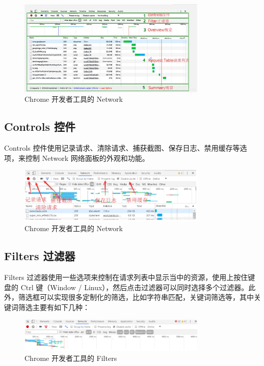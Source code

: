 \begin{figure}[htb]
\centering 
\includegraphics[width=0.80\textwidth]{img/newch1m7.png} 
\caption{Chrome 开发者工具的 Network}
\label{Test}
\end{figure}

\subsection{Controls 控件}

Controls 控件使用记录请求、清除请求、捕获截图、保存日志、禁用缓存等选项，来控制 Network 网络面板的外观和功能。

\begin{figure}[htb]
\centering 
\includegraphics[width=0.80\textwidth]{img/newch1m8.png} 
\caption{Chrome 开发者工具的 Network}
\label{Test}
\end{figure}

\subsection{Filters 过滤器}

Filters 过滤器使用一些选项来控制在请求列表中显示当中的资源，使用上按住键盘的 Ctrl 键（Window / Linux），然后点击过滤器可以同时选择多个过滤器。此外，筛选框可以实现很多定制化的筛选，比如字符串匹配，关键词筛选等，其中关键词筛选主要有如下几种：

\begin{figure}[htb]
\centering 
\includegraphics[width=0.80\textwidth]{img/newch1m9.png} 
\caption{Chrome 开发者工具的 Filters}
\label{Test}
\end{figure}

